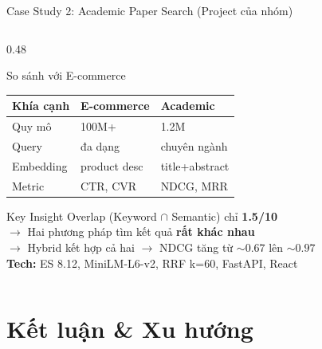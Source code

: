 \documentclass[aspectratio=169, 11pt]{beamer}
\begin{document}
\begin{frame}{Case Study 2: Academic Paper Search (Project của nhóm)}
\begin{columns}[T]
\begin{column}{0.48\textwidth}
\begin{alertblock}{So sánh với E-commerce}
{\scriptsize
\begin{tabular}{l l l}
\toprule
\textbf{Khía cạnh} & \textbf{E-commerce} & \textbf{Academic} \\
\midrule
Quy mô & 100M+ & 1.2M \\
Query & đa dạng & chuyên ngành \\
Embedding & product desc & title+abstract \\
Metric & CTR, CVR & NDCG, MRR \\
\bottomrule
\end{tabular}
}
\end{alertblock}

\vspace{0.05cm}

\begin{block}{Key Insight}
{\scriptsize Overlap (Keyword $\cap$ Semantic) chỉ \textbf{1.5/10}\\
$\to$ Hai phương pháp tìm kết quả \textbf{rất khác nhau}\\
$\to$ Hybrid kết hợp cả hai $\to$ NDCG tăng từ ${\sim}0.67$ lên ${\sim}0.97$\\[3pt]
\textbf{Tech:} ES 8.12, MiniLM-L6-v2, RRF k=60, FastAPI, React}
\end{block}

\end{column}
\end{columns}
\end{frame}

\section{Kết luận \& Xu hướng}
\end{document}
